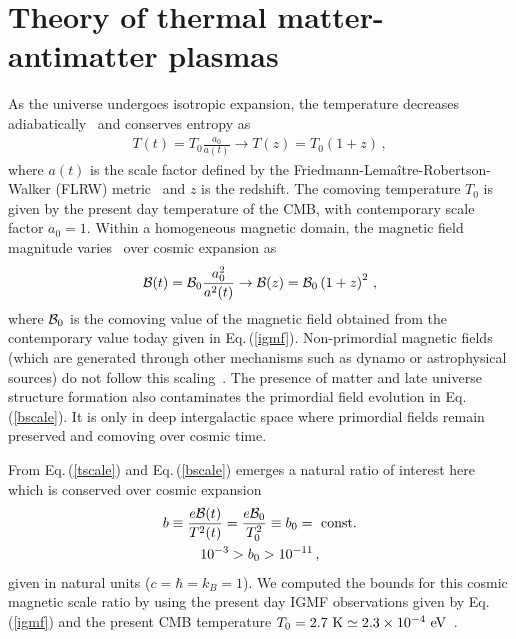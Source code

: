 \documentclass[aps,prd,floatfix,reprint]{revtex4-2}
\newcommand*{\eV}{\text{ eV}}
\newcommand{\req}[1]{Eq.\,(\ref{#1})}
\begin{document}
\section{Theory of thermal matter-antimatter plasmas}
\label{sec:thermal}
\noindent As the universe undergoes isotropic expansion, the temperature decreases adiabatically~\cite{Abdalla:2022yfr} and conserves entropy as 
\begin{align}
 \label{tscale}
 T(t)=T_{0}\frac{a_{0}}{a(t)}\rightarrow T(z)=T_{0}(1+z)\,,
\end{align}
where $a(t)$ is the scale factor defined by the Friedmann-Lema{\^i}tre-Robertson-Walker (FLRW) metric~\cite{weinberg1972gravitation} and $z$ is the redshift. The comoving temperature $T_{0}$ is given by the present day temperature of the CMB, with contemporary scale factor $a_{0}=1$. Within a homogeneous magnetic domain, the magnetic field magnitude varies~\cite{Durrer:2013pga} over cosmic expansion as
\begin{align}
 \label{bscale}
 {\cal B}(t)={\cal B}_{0}\frac{a_{0}^{2}}{a^{2}(t)}\rightarrow{\cal B}(z)={\cal B}_{0}\left(1+z\right)^{2}\,,
\end{align}
where ${\cal B}_{0}$ is the comoving value of the magnetic field obtained from the contemporary value today given in \req{igmf}. Non-primordial magnetic fields (which are generated through other mechanisms such as dynamo or astrophysical sources) do not follow this scaling~\cite{Pomakov:2022cem}. The presence of matter and late universe structure formation also contaminates the primordial field evolution in \req{bscale}. It is only in deep intergalactic space where primordial fields remain preserved and comoving over cosmic time.

From \req{tscale} and \req{bscale} emerges a natural ratio of interest here which is conserved over cosmic expansion 
\begin{gather}
 \label{tbscale}
 b \equiv\frac{e{\cal B}(t)}{T^{2}(t)}=\frac{e{\cal B}_{0}}{T_{0}^{2}}\equiv b_0={\rm\ const.}\\
 10^{-3}>b_{0}>10^{-11}\,,
\end{gather}
given in natural units ($c=\hbar=k_{B}=1$). We computed the bounds for this cosmic magnetic scale ratio by using the present day IGMF observations given by \req{igmf} and the present CMB temperature $T_{0}=2.7{\rm\ K}\simeq2.3\times10^{-4}\eV$~\cite{Planck:2018vyg}.
\end{document}
